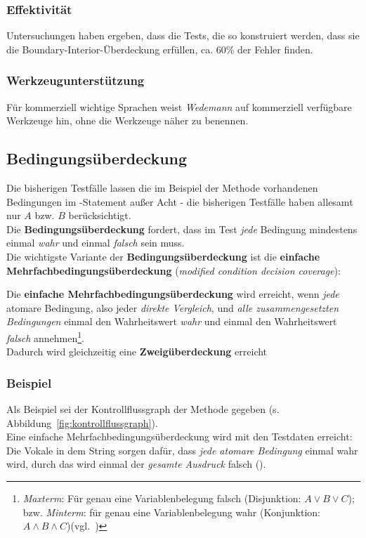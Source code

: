 \subsubsection*{Effektivität}
Untersuchungen haben ergeben, dass die Tests, die so konstruiert werden, dass sie die Boundary-Interior-Überdeckung erfüllen, ca. 60\% der Fehler finden.

\subsubsection*{Werkzeugunterstützung}
Für kommerziell wichtige Sprachen weist \textit{Wedemann} auf kommerziell verfügbare Werkzeuge hin, ohne die Werkzeuge näher zu benennen.

\subsection{Bedingungsüberdeckung}
Die bisherigen Testfälle lassen die im Beispiel der Methode  vorhandenen Bedingungen im -Statement außer Acht - die bisherigen Testfälle haben allesamt nur $A$ bzw. $B$ berücksichtigt.\\
Die \textbf{Bedingungsüberdeckung} fordert, dass im Test \textit{jede} Bedingung mindestens einmal \textit{wahr} und einmal \textit{falsch} sein muss.\\
Die wichtigste Variante der \textbf{Bedingungsüberdeckung} ist die \textbf{einfache Mehrfachbedingungsüberdeckung} (\textit{modified condition decision coverage}):

\begin{tcolorbox}[title=Einfache Mehrfachbedingungsüberdeckung]
Die \textbf{einfache Mehrfachbedingungsüberdeckung} wird erreicht, wenn \textit{jede} atomare Bedingung, also jeder \textit{direkte Vergleich}, und \textit{alle zusammengesetzten Bedingungen} einmal den Wahrheitswert \textit{wahr} und einmal den Wahrheitswert \textit{falsch} annehmen\footnote{
    \textit{Maxterm}: Für genau eine Variablenbelegung falsch (Disjunktion: $A \lor B \lor C$); bzw. \textit{Minterm}: für genau eine Variablenbelegung wahr (Konjunktion: $A \land B \land C$)(vgl.~\cite[92]{Hof22})
}.\\
    Dadurch wird gleichzeitig eine \textbf{Zweigüberdeckung} erreicht
\end{tcolorbox}

\subsubsection*{Beispiel}
Als Beispiel sei der Kontrollflussgraph der Methode  gegeben (s. Abbildung~\ref{fig:kontrollflussgraph}).\\
Eine einfache Mehrfachbedingungsüberdeckung wird mit den Testdaten  erreicht: Die Vokale in dem String sorgen dafür, dass \textit{jede atomare Bedingung} einmal wahr wird, durch das  wird einmal der \textit{gesamte Ausdruck} falsch ().

